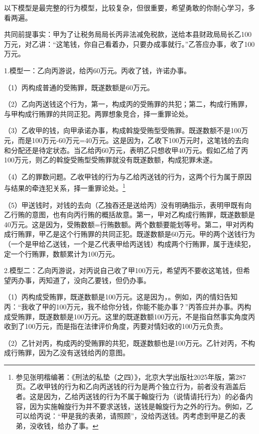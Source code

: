 以下模型是最完整的行为模型，比较复杂，但很重要，希望勇敢的你耐心学习，多看两遍。

共同前提事实：甲为了让税务局局长丙非法减免税款，送给本县财政局局长乙100万元，对乙讲：“这笔钱，你自己看着办，只要办成事就行。”乙答应办事，收了100万元。

1.模型一：乙向丙游说，给丙60万元。丙收了钱，许诺办事。

（1）丙构成普通的受贿罪，既遂数额是60万元。

（2）乙向丙送钱这个行为，第一，构成丙的受贿罪的共犯；第二，构成行贿罪，与甲构成行贿罪的共同正犯。两罪想象竞合，择一重罪论处。

（3）乙收甲的钱，向甲承诺办事，构成斡旋受贿型受贿罪。既遂数额不是100万元，而是100万元-60万元=40万元。这是因为，乙收下100万元时，这笔钱的去向和分配还是待定状态。当乙给丙60万元，表明乙只想收甲40万元。假如乙给了丙100万元，则乙的斡旋受贿型受贿罪就没有既遂数额，构成犯罪未遂。

（4）乙的罪数问题。乙收甲钱的行为与乙给丙送钱的行为，这两个行为属于原因与结果的牵连犯关系，择一重罪论处。\footnote{参见张明楷编著：《刑法的私垫（之四）》，北京大学出版社2025年版，第287页。乙收甲钱的行为和乙向丙送钱的行为是两个独立行为，前者没有涵盖后者。这是因为，乙给丙送钱的行为不属于翰旋行为（说情请托行为）的必备内容，因为实施翰旋行为并不要求送钱，送钱是翰旋行为之外的行为。例如，乙可以给丙说：“甲是我的表弟，请照顾”，没给丙送钱。丙考虑到甲是乙的表弟，没收钱，给办了事。}

（5）甲送钱时，对钱的去向（乙独吞还是送给丙）没有明确指示，表明甲既有向乙行贿的意图，也有向丙行贿的概括故意。第一，甲对乙构成行贿罪，既遂数额是40万元。这是因为，受贿数额=行贿数额。两个数额要能划等号。第二，甲对丙构成行贿罪，甲乙是这个行贿罪的共同正犯。既遂数额是60万元。甲的两个送钱行为（一个是甲给乙送钱，一个是乙代表甲给丙送钱）构成两个行贿罪，属于连续犯，定一个行贿罪，数额累计为100万元。

2.模型二：乙向丙游说，对丙说自己收了甲100万元，希望丙不要收这笔钱，但希望丙办事，丙知道了，没向乙要钱，但仍办事。

（1）丙构成受贿罪，既遂数额是100万元。这是因为，。例如，丙的情妇告知丙：“我收了甲的100万元，我不给你分钱，你能不能办事？”丙答应并办事。丙构成受贿罪，既遂数额是100万元。这里的既遂数额100万元，不是指自然事实角度丙收到了100万元，而是指在法律评价角度，丙要对情妇收的100万元负责。

（2）乙针对丙，构成丙的受贿罪的共犯，既遂数额也是100万元。乙针对丙，不构成行贿罪，因为乙没有送钱给丙的意图。

